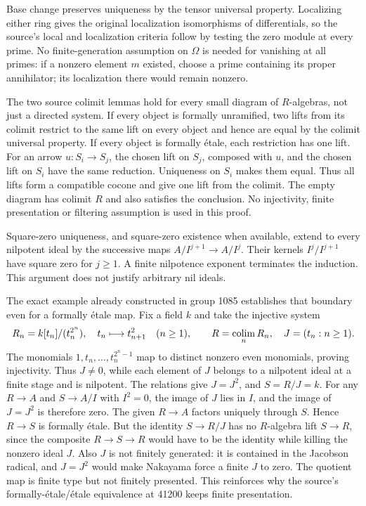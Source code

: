 Base change preserves uniqueness by the tensor universal property. Localizing either ring gives the original localization isomorphisms of differentials, so the source's local and localization criteria follow by testing the zero module at every prime. No finite-generation assumption on \(\Omega\) is needed for vanishing at all primes: if a nonzero element \(m\) existed, choose a prime containing its proper annihilator; its localization there would remain nonzero.

The two source colimit lemmas hold for every small diagram of \(R\)-algebras, not just a directed system. If every object is formally unramified, two lifts from its colimit restrict to the same lift on every object and hence are equal by the colimit universal property. If every object is formally étale, each restriction has one lift. For an arrow \(u:S_i\to S_j\), the chosen lift on \(S_j\), composed with \(u\), and the chosen lift on \(S_i\) have the same reduction. Uniqueness on \(S_i\) makes them equal. Thus all lifts form a compatible cocone and give one lift from the colimit. The empty diagram has colimit \(R\) and also satisfies the conclusion. No injectivity, finite presentation or filtering assumption is used in this proof.

Square-zero uniqueness, and square-zero existence when available, extend to every nilpotent ideal by the successive maps \(A/I^{j+1}\to A/I^j\). Their kernels \(I^j/I^{j+1}\) have square zero for \(j\geq1\). A finite nilpotence exponent terminates the induction. This argument does not justify arbitrary nil ideals.

The exact example already constructed in group 1085 establishes that boundary even for a formally étale map. Fix a field \(k\) and take the injective system \[
R_n=k[t_n]/(t_n^{2^n}),\quad
t_n\longmapsto t_{n+1}^2\quad(n\geq1),\qquad
R=\mathop{\rm colim}_nR_n,\quad J=(t_n:n\geq1).
\] The monomials \(1,t_n,\ldots,t_n^{2^n-1}\) map to distinct nonzero even monomials, proving injectivity. Thus \(J\ne0\), while each element of \(J\) belongs to a nilpotent ideal at a finite stage and is nilpotent. The relations give \(J=J^2\), and \(S=R/J=k\). For any \(R\to A\) and \(S\to A/I\) with \(I^2=0\), the image of \(J\) lies in \(I\), and the image of \(J=J^2\) is therefore zero. The given \(R\to A\) factors uniquely through \(S\). Hence \(R\to S\) is formally étale. But the identity \(S\to R/J\) has no \(R\)-algebra lift \(S\to R\), since the composite \(R\to S\to R\) would have to be the identity while killing the nonzero ideal \(J\). Also \(J\) is not finitely generated: it is contained in the Jacobson radical, and \(J=J^2\) would make Nakayama force a finite \(J\) to zero. The quotient map is finite type but not finitely presented. This reinforces why the source's formally-étale/étale equivalence at 41200 keeps finite presentation.

